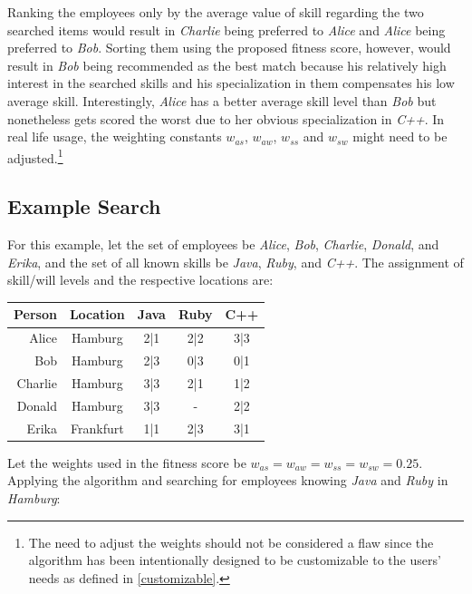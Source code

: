 Ranking the employees only by the average value of skill regarding the two searched items would result in \textit{Charlie} being preferred to \textit{Alice} and \textit{Alice} being preferred to \textit{Bob}. Sorting them using the proposed fitness score, however, would result in \textit{Bob} being recommended as the best match because his relatively high interest in the searched skills and his specialization in them compensates his low average skill. Interestingly, \textit{Alice} has a better average skill level than \textit{Bob} but nonetheless gets scored the worst due to her obvious specialization in \textit{C++}. In real life usage, the weighting constants $w_{as}$, $w_{aw}$, $w_{ss}$ and $ w_{sw}$ might need to be adjusted.\footnote{The need to adjust the weights should not be considered a flaw since the algorithm has been intentionally designed to be customizable to the users' needs as defined in \ref{customizable}.}

\newpage
\subsection{Example Search}
For this example, let the set of employees be \textit{Alice}, \textit{Bob}, \textit{Charlie}, \textit{Donald}, and \textit{Erika}, and the set of all known skills be \textit{Java}, \textit{Ruby}, and \textit{C++}.
The assignment of skill/will levels and the respective locations are:
\newline
\begin{center}
\begin{tabular}{r|c|ccc}
  Person  & Location & Java & Ruby & C++ \\
  \hline
  Alice   & Hamburg   & 2|1 & 2|2 & 3|3 \\
  Bob     & Hamburg   & 2|3 & 0|3 & 0|1 \\
  Charlie & Hamburg   & 3|3 & 2|1 & 1|2 \\
  Donald  & Hamburg   & 3|3 &  -  & 2|2 \\
  Erika   & Frankfurt & 1|1 & 2|3 & 3|1 \\
\end{tabular}
\end{center}

Let the weights used in the fitness score be $w_{as} = w_{aw} = w_{ss} = w_{sw} = 0.25$.
Applying the algorithm and searching for employees knowing \textit{Java} and \textit{Ruby} in \textit{Hamburg}:\\

